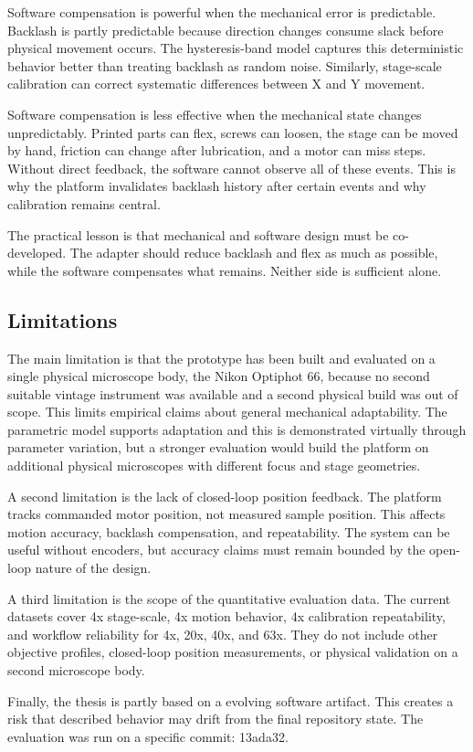 Software compensation is powerful when the mechanical error is predictable. Backlash is partly predictable because direction changes consume slack before physical movement occurs. The hysteresis-band model captures this deterministic behavior better than treating backlash as random noise. Similarly, stage-scale calibration can correct systematic differences between X and Y movement.

Software compensation is less effective when the mechanical state changes unpredictably. Printed parts can flex, screws can loosen, the stage can be moved by hand, friction can change after lubrication, and a motor can miss steps. Without direct feedback, the software cannot observe all of these events. This is why the platform invalidates backlash history after certain events and why calibration remains central.

The practical lesson is that mechanical and software design must be co-developed. The adapter should reduce backlash and flex as much as possible, while the software compensates what remains. Neither side is sufficient alone.

\subsection{Limitations}

The main limitation is that the prototype has been built and evaluated on a single physical microscope body, the Nikon Optiphot 66, because no second suitable vintage instrument was available and a second physical build was out of scope. This limits empirical claims about general mechanical adaptability. The parametric model supports adaptation and this is demonstrated virtually through parameter variation, but a stronger evaluation would build the platform on additional physical microscopes with different focus and stage geometries.

A second limitation is the lack of closed-loop position feedback. The platform tracks commanded motor position, not measured sample position. This affects motion accuracy, backlash compensation, and repeatability. The system can be useful without encoders, but accuracy claims must remain bounded by the open-loop nature of the design.

A third limitation is the scope of the quantitative evaluation data. The current datasets cover 4x stage-scale, 4x motion behavior, 4x calibration repeatability, and workflow reliability for 4x, 20x, 40x, and 63x. They do not include other objective profiles, closed-loop position measurements, or physical validation on a second microscope body.

Finally, the thesis is partly based on a evolving software artifact. This creates a risk that described behavior may drift from the final repository state. The evaluation was run on a specific commit: 13ada32.
